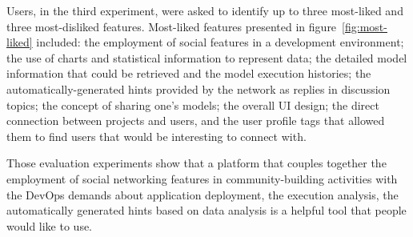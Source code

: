 Users, in the third experiment, were asked to identify up to three most-liked and three most-disliked features. Most-liked features presented in figure~\ref{fig:most-liked} included: the employment of social features in a development environment; the use of charts and statistical information to represent data; the detailed model information that could be retrieved and the model execution histories; the automatically-generated hints provided by the network as replies in discussion topics; the concept of sharing one’s models; the overall UI design; the direct connection between projects and users, and the user profile tags that allowed them to find users that would be interesting to connect with.

Those evaluation experiments show that a platform that couples together the employment of social networking features in community-building activities with the DevOps demands about application deployment, the execution analysis, the automatically generated hints based on data analysis is a helpful tool that people would like to use.